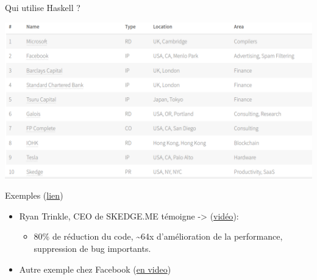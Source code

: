 \documentclass[presentation]{beamer}
\begin{document}
\begin{frame}[label={sec:org22e9edb}]{Qui utilise Haskell ?}
\begin{center}
\includegraphics[height=.5\textheight]{Images/quiUtiliseHaskell.png}
\end{center}
\begin{block}{Exemples (\href{https://haskellcosm.com/}{lien})}
\begin{itemize}
\item Ryan Trinkle,  CEO de SKEDGE.ME témoigne -> (\href{https://www.youtube.com/watch?v=BveDrw9CwEg}{vidéo}):
\begin{itemize}
\item 80\% de réduction du code, \textasciitilde{}64x d'amélioration de la performance, suppression de bug importants.
\end{itemize}
\item Autre exemple chez Facebook (\href{https://www.youtube.com/watch?v=mlTO510zO78}{en video})
\end{itemize}
\end{block}
\end{frame}
\end{document}
